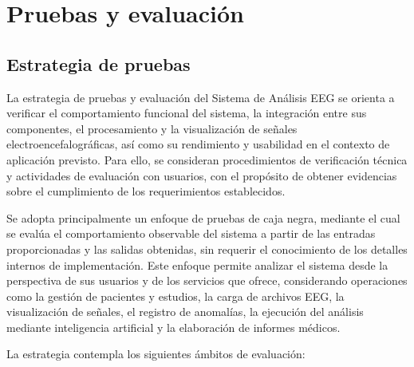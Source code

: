 
\chapter{Pruebas y evaluación}
\label{pruebas_evaluacion}

\section{Estrategia de pruebas}
\label{sec:estrategia_pruebas}

La estrategia de pruebas y evaluación del Sistema de Análisis EEG se orienta a verificar el comportamiento funcional del sistema, la integración entre sus componentes, el procesamiento y la visualización de señales electroencefalográficas, así como su rendimiento y usabilidad en el contexto de aplicación previsto. Para ello, se consideran procedimientos de verificación técnica y actividades de evaluación con usuarios, con el propósito de obtener evidencias sobre el cumplimiento de los requerimientos establecidos.

Se adopta principalmente un enfoque de pruebas de caja negra, mediante el cual se evalúa el comportamiento observable del sistema a partir de las entradas proporcionadas y las salidas obtenidas, sin requerir el conocimiento de los detalles internos de implementación. Este enfoque permite analizar el sistema desde la perspectiva de sus usuarios y de los servicios que ofrece, considerando operaciones como la gestión de pacientes y estudios, la carga de archivos EEG, la visualización de señales, el registro de anomalías, la ejecución del análisis mediante inteligencia artificial y la elaboración de informes médicos.

La estrategia contempla los siguientes ámbitos de evaluación:

